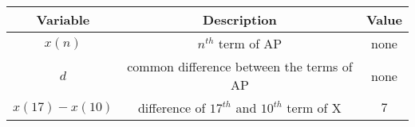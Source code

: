 
      \begin{tabular}{|c|c|c|} 
      \hline
\textbf{Variable}& \textbf{Description}& \textbf{Value}\\\hline
         $x(n)$& $n^{th}$ term of AP&none\\\hline
          $d$&common difference between the terms of AP&none\\\hline
          $x(17)-x(10)$& difference of $17^{th}$  and $10^{th}$ term of X &$7$ \\ \hline
         
    \end{tabular}
